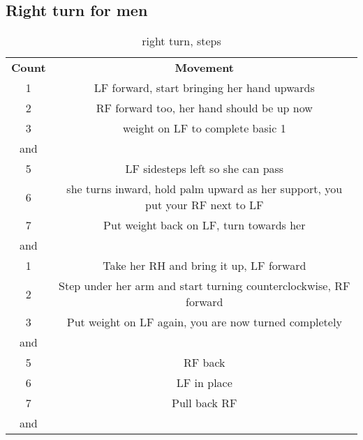 \subsection{Right turn for men}
\begin{table}[H]
\centering
\begin{tabular}{cc}
  \toprule
  \textbf{Count} & \textbf{Movement}\\
  \cmidrule(lr){1-1}\cmidrule(lr){2-2}
  1 & LF forward, start bringing her hand upwards\\
  2 & RF forward too, her hand should be up now\\
  3 & weight on LF to complete basic 1\\
  and & \\
  5 & LF sidesteps left so she can pass\\
  6 & she turns inward, hold palm upward as her support, you put your RF next to LF\\
  7 & Put weight back on LF, turn towards her\\
  and & \\
  1 & Take her RH and bring it up, LF forward\\
  2 & Step under her arm and start turning counterclockwise, RF forward\\
  3 & Put weight on LF again, you are now turned completely\\
  and & \\
  5 & RF back\\
  6 & LF in place\\
  7 & Pull back RF\\
  and & \\
  \bottomrule
\end{tabular}
\label{right_turn_steps}
\caption{right turn, steps}
\end{table}


